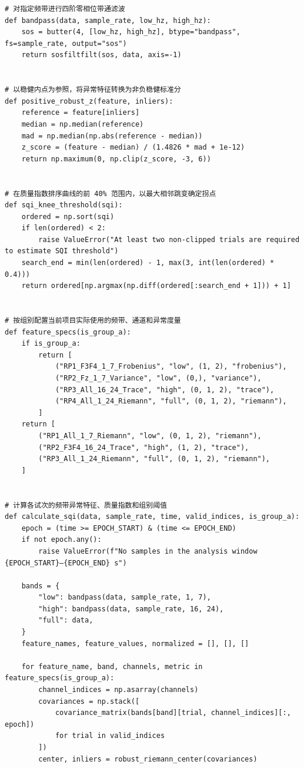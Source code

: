 \begin{lstlisting}[style=appendixPython]
# 对指定频带进行四阶零相位带通滤波
def bandpass(data, sample_rate, low_hz, high_hz):
    sos = butter(4, [low_hz, high_hz], btype="bandpass", fs=sample_rate, output="sos")
    return sosfiltfilt(sos, data, axis=-1)


# 以稳健内点为参照，将异常特征转换为非负稳健标准分
def positive_robust_z(feature, inliers):
    reference = feature[inliers]
    median = np.median(reference)
    mad = np.median(np.abs(reference - median))
    z_score = (feature - median) / (1.4826 * mad + 1e-12)
    return np.maximum(0, np.clip(z_score, -3, 6))


# 在质量指数排序曲线的前 40% 范围内，以最大相邻跳变确定拐点
def sqi_knee_threshold(sqi):
    ordered = np.sort(sqi)
    if len(ordered) < 2:
        raise ValueError("At least two non-clipped trials are required to estimate SQI threshold")
    search_end = min(len(ordered) - 1, max(3, int(len(ordered) * 0.4)))
    return ordered[np.argmax(np.diff(ordered[:search_end + 1])) + 1]


# 按组别配置当前项目实际使用的频带、通道和异常度量
def feature_specs(is_group_a):
    if is_group_a:
        return [
            ("RP1_F3F4_1_7_Frobenius", "low", (1, 2), "frobenius"),
            ("RP2_Fz_1_7_Variance", "low", (0,), "variance"),
            ("RP3_All_16_24_Trace", "high", (0, 1, 2), "trace"),
            ("RP4_All_1_24_Riemann", "full", (0, 1, 2), "riemann"),
        ]
    return [
        ("RP1_All_1_7_Riemann", "low", (0, 1, 2), "riemann"),
        ("RP2_F3F4_16_24_Trace", "high", (1, 2), "trace"),
        ("RP3_All_1_24_Riemann", "full", (0, 1, 2), "riemann"),
    ]


# 计算各试次的频带异常特征、质量指数和组别阈值
def calculate_sqi(data, sample_rate, time, valid_indices, is_group_a):
    epoch = (time >= EPOCH_START) & (time <= EPOCH_END)
    if not epoch.any():
        raise ValueError(f"No samples in the analysis window {EPOCH_START}–{EPOCH_END} s")

    bands = {
        "low": bandpass(data, sample_rate, 1, 7),
        "high": bandpass(data, sample_rate, 16, 24),
        "full": data,
    }
    feature_names, feature_values, normalized = [], [], []

    for feature_name, band, channels, metric in feature_specs(is_group_a):
        channel_indices = np.asarray(channels)
        covariances = np.stack([
            covariance_matrix(bands[band][trial, channel_indices][:, epoch])
            for trial in valid_indices
        ])
        center, inliers = robust_riemann_center(covariances)


\end{lstlisting}

